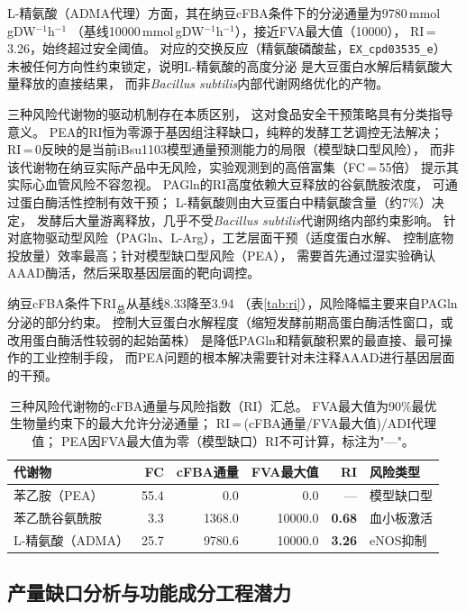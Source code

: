 \documentclass[10pt, a4paper, twocolumn]{ctexart}
\newcommand{\ibsu}{iBsu1103}
\newcommand{\bs}{\textit{Bacillus subtilis}}
\newcommand{\cfba}{cFBA}
\newcommand{\mmolg}{mmol\,gDW$^{-1}$h$^{-1}$}
\begin{document}
L-精氨酸（ADMA代理）方面，其在纳豆cFBA条件下的分泌通量为9780\,\mmolg{}
（基线10000\,\mmolg{}），接近FVA最大值（10000），
RI\,=\,3.26，始终超过安全阈值。
对应的交换反应（精氨酸磷酸盐，\texttt{EX\_cpd03535\_e}）
未被任何方向性约束锁定，说明L-精氨酸的高度分泌
是大豆蛋白水解后精氨酸大量释放的直接结果，
而非\bs{}内部代谢网络优化的产物。

三种风险代谢物的驱动机制存在本质区别，
这对食品安全干预策略具有分类指导意义。
PEA的RI恒为零源于基因组注释缺口，纯粹的发酵工艺调控无法解决；
RI\,=\,0反映的是当前\ibsu{}模型通量预测能力的局限（模型缺口型风险），
而非该代谢物在纳豆实际产品中无风险，实验观测到的高倍富集（FC\,=\,55倍）
提示其实际心血管风险不容忽视。
PAGln的RI高度依赖大豆释放的谷氨酰胺浓度，
可通过蛋白酶活性控制有效干预；
L-精氨酸则由大豆蛋白中精氨酸含量（约7\%）决定，
发酵后大量游离释放，几乎不受\bs{}代谢网络内部约束影响。
针对底物驱动型风险（PAGln、L-Arg），工艺层面干预（适度蛋白水解、
控制底物投放量）效率最高；针对模型缺口型风险（PEA），
需要首先通过湿实验确认AAAD酶活，然后采取基因层面的靶向调控。

纳豆\cfba{}条件下$\mathrm{RI}_\text{总}$从基线8.33降至3.94
（表\ref{tab:ri}），风险降幅主要来自PAGln分泌的部分约束。
控制大豆蛋白水解程度（缩短发酵前期高蛋白酶活性窗口，或改用蛋白酶活性较弱的起始菌株）
是降低PAGln和精氨酸积累的最直接、最可操作的工业控制手段，
而PEA问题的根本解决需要针对未注释AAAD进行基因层面的干预。

\begin{table}[t]
\caption{三种风险代谢物的cFBA通量与风险指数（RI）汇总。
  FVA最大值为90\%最优生物量约束下的最大允许分泌通量；
  RI\,=\,(cFBA通量/FVA最大值)/ADI代理值；
  PEA因FVA最大值为零（模型缺口）RI不可计算，标注为"—"。}
\label{tab:risk_main}
\small
\centering
\begin{tabular}{lrrrrl}
\toprule
\textbf{代谢物} & \textbf{FC} & \textbf{cFBA通量} & \textbf{FVA最大值} & \textbf{RI} & \textbf{风险类型} \\
\midrule
苯乙胺（PEA）     & 55.4 &     0.0 &     0.0 & —             & 模型缺口型 \\
苯乙酰谷氨酰胺    &  3.3 &  1368.0 & 10000.0 & \textbf{0.68} & 血小板激活 \\
L-精氨酸（ADMA）  & 25.7 &  9780.6 & 10000.0 & \textbf{3.26} & eNOS抑制   \\
\bottomrule
\end{tabular}
\end{table}

\subsection{产量缺口分析与功能成分工程潜力}
\label{sec:yield}
\end{document}
